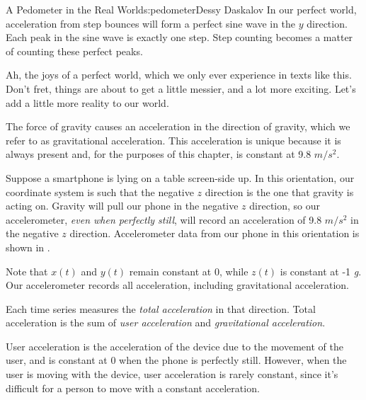 \begin{aosachapter}{A Pedometer in the Real World}{s:pedometer}{Dessy Daskalov}
In our perfect world, acceleration from step bounces will form a perfect
sine wave in the $y$ direction. Each peak in the sine wave is exactly
one step. Step counting becomes a matter of counting these perfect
peaks.

Ah, the joys of a perfect world, which we only ever experience in texts
like this. Don't fret, things are about to get a little messier, and a
lot more exciting. Let's add a little more reality to our world.

\label{even-perfect-worlds-have-fundamental-forces-of-nature}

The force of gravity causes an acceleration in the direction of gravity,
which we refer to as gravitational acceleration. This acceleration is
unique because it is always present and, for the purposes of this
chapter, is constant at 9.8 $m/s^2$.

Suppose a smartphone is lying on a table screen-side up. In this
orientation, our coordinate system is such that the negative $z$
direction is the one that gravity is acting on. Gravity will pull our
phone in the negative $z$ direction, so our accelerometer, \emph{even
when perfectly still}, will record an acceleration of 9.8 $m/s^2$ in the
negative $z$ direction. Accelerometer data from our phone in this
orientation is shown in
.


Note that $x(t)$ and $y(t)$ remain constant at 0, while $z(t)$ is
constant at -1 \emph{g}. Our accelerometer records all acceleration,
including gravitational acceleration.

Each time series measures the \emph{total acceleration} in that
direction. Total acceleration is the sum of \emph{user acceleration} and
\emph{gravitational acceleration}.

User acceleration is the acceleration of the device due to the movement
of the user, and is constant at 0 when the phone is perfectly still.
However, when the user is moving with the device, user acceleration is
rarely constant, since it's difficult for a person to move with a
constant acceleration.



\end{aosachapter}
